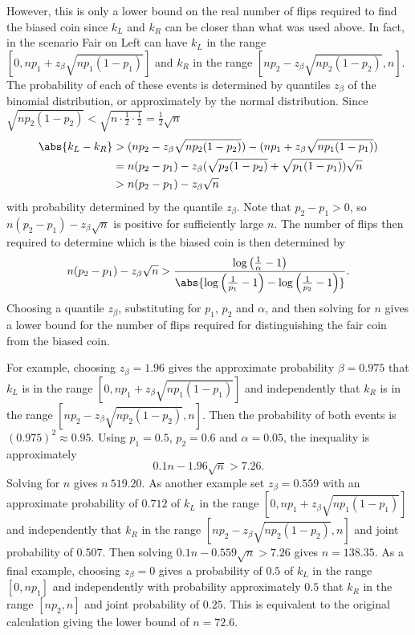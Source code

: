 \documentclass[12pt]{article}
\begin{document}
However, this is only a lower bound on the real number of flips required
to find the biased coin since \( k_L \) and \( k_R \) can be closer than
what was used above.  In fact, in the scenario Fair on Left can have \(
k_L \) in the range \( [0, np_1+z_{\beta}\sqrt{np_1(1-p_1)}] \) and \( k_R
\) in the range \( [ np_2 - z_{\beta}\sqrt{np_2(1-p_2)}, n] \).  The
probability of each of these events is determined by quantiles \( z_{\beta}
\) of the binomial distribution, or approximately by the normal
distribution. Since \( \sqrt{np_2(1-p_2)} < \sqrt{n \cdot \frac{1}{2}
\cdot \frac{1}{2}} = \frac{1}{2}\sqrt{n} \)
\begin{align*}
    \abs{k_L - k_R} &> (np_2 - z_{\beta}\sqrt{np_2(1-p_2)}) - (np_1+z_{\beta}\sqrt
    {np_1(1-p_1)}) \\
    &= n(p_2-p_1) - z_{\beta}(\sqrt{p_2(1-p_2)} + \sqrt{p_1(1-p_1)})
    \sqrt{n} \\
    &> n(p_2-p_1) - z_{\beta} \sqrt{n}
\end{align*}
with probability determined by the quantile \( z_{\beta} \).  Note that
\( p_2-p_1 >0 \), so \( n(p_2-p_1) - z_{\beta} \sqrt{n} \)
is positive for sufficiently large \( n \).
The number of flips then required to determine which is the biased coin
is then determined by
\[
    n(p_2-p_1) - z_{\beta} \sqrt{n} > 
     \frac{\log \left(\frac{1}{\alpha} - 1 \right)}{\abs{ \log\left
    ( \frac{1}{p_1} - 1 \right) - \log\left( \frac{1}{p_2} - 1 \right) }}.
\] Choosing a quantile \( z_{\beta} \), substituting for \( p_1 \), \( p_2
\) and \( \alpha \), and then solving for \( n \) gives a lower bound
for the number of flips required for distinguishing the fair coin from
the biased coin.

For example, choosing \( z_{\beta} = 1.96 \) gives the approximate
probability \( \beta = 0.975 \) that \( k_L \) is in the range \( [0, np_1+z_
{\beta}\sqrt{np_1(1-p_1)}] \) and independently that \( k_R \) is in the
range \( [ np_2 - z_{\beta}\sqrt{np_2(1-p_2)}, n] \).  Then the
probability of both events is  \( (0.975)^2 \approx 0.95 \).
Using \( p_1 = 0.5 \), \( p_2 = 0.6 \) and \( \alpha = 0.05 \), the
inequality is approximately
\[
    0.1 n - 1.96 \sqrt{n} > 7.26.
\] Solving for \( n \) gives \( n \ 519.20 \).  As another example set \(
z_{\beta} = 0.559 \) with an approximate probability of \( 0.712 \) of \( k_L \) in
the range \( [0, np_1+z_{\beta}\sqrt{np_1(1-p_1)}] \) and independently
that \( k_R \) in the range \( [ np_2 - z_{\beta}\sqrt{np_2(1-p_2)}, n] \)
and joint probability of \( 0.507 \).  Then solving \( 0.1 n - 0.559
\sqrt{n} > 7.26 \) gives \( n = 138.35 \).  As a final example, choosing \(
z_{\beta} = 0 \) gives a probability of \( 0.5 \) of \( k_L \) in the
range \( [0, np_1] \) and independently with probability approximately \(
0.5 \) that \( k_R \) in the range \( [ np_2, n] \) and joint
probability of \( 0.25 \).  This is equivalent to the original
calculation giving the lower bound of \( n=72.6 \).
\end{document}
